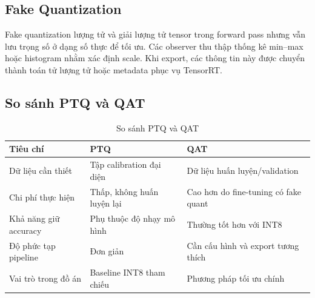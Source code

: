 \subsection{Fake Quantization}

Fake quantization lượng tử và giải lượng tử tensor trong forward pass nhưng vẫn
lưu trọng số ở dạng số thực để tối ưu. Các observer thu thập thống kê min--max
hoặc histogram nhằm xác định scale. Khi export, các thông tin này được chuyển
thành toán tử lượng tử hoặc metadata phục vụ TensorRT.

\subsection{So sánh PTQ và QAT}

\begin{table}[H]
\centering
\caption{So sánh PTQ và QAT}
\label{tab:ptq-qat}
\begin{tabularx}{\textwidth}{L{3.2cm}YY}
\toprule
\textbf{Tiêu chí} & \textbf{PTQ} & \textbf{QAT}\\
\midrule
Dữ liệu cần thiết & Tập calibration đại diện & Dữ liệu huấn luyện/validation\\
Chi phí thực hiện & Thấp, không huấn luyện lại & Cao hơn do fine-tuning có fake quant\\
Khả năng giữ accuracy & Phụ thuộc độ nhạy mô hình & Thường tốt hơn với INT8\\
Độ phức tạp pipeline & Đơn giản & Cần cấu hình và export tương thích\\
Vai trò trong đồ án & Baseline INT8 tham chiếu & Phương pháp tối ưu chính\\
\bottomrule
\end{tabularx}
\end{table}